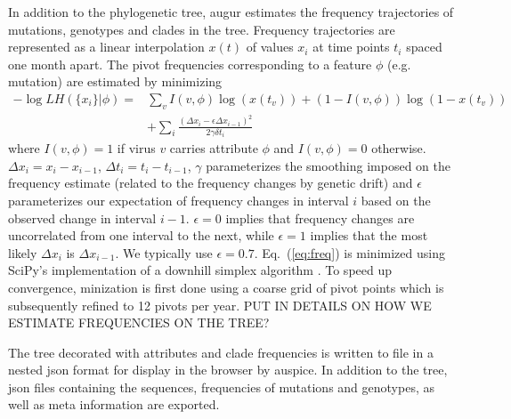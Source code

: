 \documentclass{bioinfo}
\newcommand{\EQ}[1]{Eq.~(\ref{eq:#1})}
\begin{document}
In addition to the phylogenetic tree, augur estimates the frequency trajectories of mutations, genotypes and clades in the tree. 
Frequency trajectories are represented as a linear interpolation $x(t)$ of values $x_i$ at time points  $t_i$ spaced one month apart. 
The pivot frequencies corresponding to a feature $\phi$ (e.g. mutation) are estimated by minimizing
\begin{equation}
\label{eq:freq}
	\begin{split}
	-\log LH(\{x_i\} | \phi)  =& \sum_v I(v,\phi)\log(x(t_v)) + (1-I(v,\phi))\log(1-x(t_v)) \\
			&+\sum_i \frac{(\Delta x_i - \epsilon\Delta x_{i-1})^2}{2\gamma \delta t_i}
\end{split}
\end{equation}
where $I(v,\phi)=1$ if virus $v$ carries attribute $\phi$ and $I(v,\phi)=0$ otherwise.
$\Delta x_i = x_i-x_{i-1}$, $\Delta t_i = t_i-t_{i-1}$, $\gamma$ parameterizes the smoothing imposed on the frequency estimate (related to the frequency changes by genetic drift) and $\epsilon$ parameterizes our expectation of frequency changes in interval $i$ based on the observed change in interval $i-1$.
$\epsilon=0$ implies that frequency changes are uncorrelated from one interval to the next, while $\epsilon=1$ implies that
the most likely $\Delta x_i$ is $\Delta x_{i-1}$.
We typically use $\epsilon = 0.7$.
\EQ{freq} is minimized using SciPy's implementation of a downhill simplex algorithm \citep{Oliphant:2007p25672}.
To speed up convergence, minization is first done using a coarse grid of pivot points which is
subsequently refined to 12 pivots per year.
PUT IN DETAILS ON HOW WE ESTIMATE FREQUENCIES ON THE TREE?

The tree decorated with attributes and clade frequencies is written to file in a nested json format for display in the browser by auspice.
In addition to the tree, json files containing the sequences, frequencies of mutations and genotypes, as well as meta information are exported.
\end{document}

